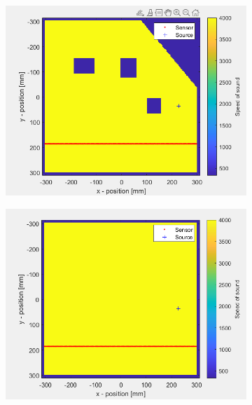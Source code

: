 \documentclass[conference]{IEEEtran}
\begin{document}
\begin{figure}[H]
\begin{subfigure}{.155\textwidth}
    \includegraphics[width=.95\linewidth]{forme3.png}
    \caption{}
    \label{fig:sfig3}
  \end{subfigure}
  \begin{subfigure}{.155\textwidth}
    \centering
    \includegraphics[width=.95\linewidth]{forme4.png}
    \caption{}
    \label{fig:sfig4}
  \end{subfigure}
  \begin{subfigure}{.155\textwidth}
    \centering

\end{subfigure}
\end{figure}
\end{document}
